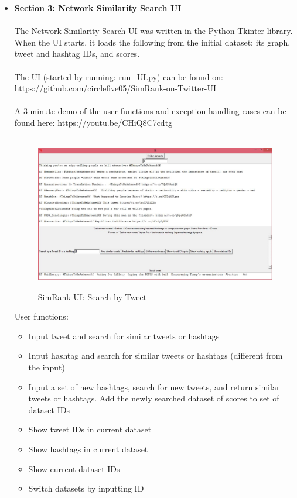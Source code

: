 \documentclass[10pt]{article}
\begin{document}
\begin{itemize}
\item{\bf Section 3: Network Similarity Search UI} 
\\\\
The Network Similarity Search UI was written in the Python Tkinter library. When the UI starts, it loads the following from the initial dataset: its graph, tweet and hashtag IDs, and scores. 
\\\\
The UI (started by running: run\_UI.py) can be found on: \\
https://github.com/circlefive05/SimRank-on-Twitter-UI
\\\\
A 3 minute demo of the user functions and exception handling cases can be found here: https://youtu.be/CHiQ8C7cdtg
\\\\
\begin{figure}[H]
	\caption{SimRank UI: Search by Tweet }
	\centering
	\includegraphics[scale=0.3]{simrank_demo_1.png}
	\label{fig6}
\end{figure}
User functions:
\begin{itemize} 
\item Input tweet and search for similar tweets or hashtags
\item Input hashtag and search for similar tweets or hashtags (different from the input)
\item Input a set of new hashtags, search for new tweets, and return similar tweets or hashtags. Add the newly searched dataset of scores to set of dataset IDs
\item Show tweet IDs in current dataset
\item Show hashtags in current dataset
\item Show current dataset IDs
\item Switch datasets by inputting ID
\end{itemize}


\end{itemize}
\end{document}
